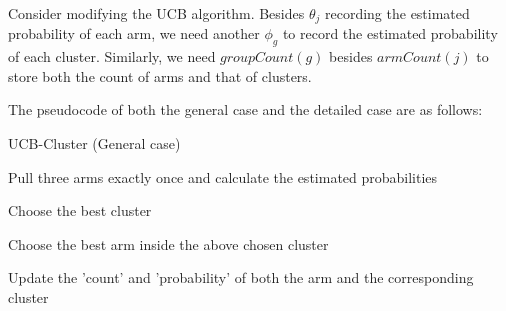 \documentclass[11pt]{article}
\begin{document}
Consider modifying the UCB algorithm. Besides \(\theta_j\) recording the
estimated probability of each arm, we need another \(\phi_g\) to record
the estimated probability of each cluster. Similarly, we need
\(groupCount(g)\) besides \(armCount(j)\) to store both the count of
arms and that of clusters.

The pseudocode of both the general case and the detailed case are as follows:


\begin{minipage}{15cm}
    \begin{algorithm}[H]
        \caption{UCB-Cluster (General case)}
        \begin{algorithmic}[1]
                \State Pull three arms exactly once and calculate the estimated probabilities
            \EndFor
                

                \State Choose the best cluster

                \State Choose the best arm inside the above chosen cluster

                \State Update the 'count' and 'probability' of both the arm and the corresponding cluster
            \EndFor

        \end{algorithmic}
    \end{algorithm}
\end{minipage}
\end{document}
